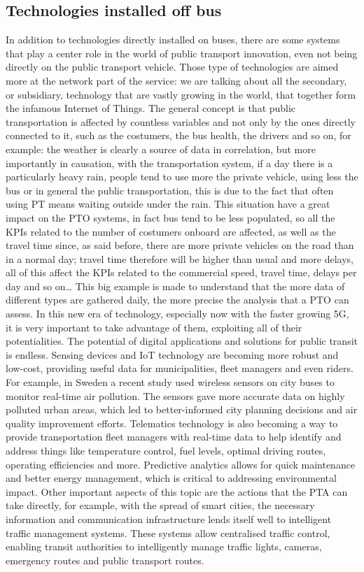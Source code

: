 \subsection{Technologies installed off bus}
\label{subsec:techoffbus}
In addition to technologies directly installed on buses, there are some systems that play a center role in the world of public transport innovation, even not being directly on the public transport vehicle. Those type of technologies are aimed more at the network part of the service: we are talking about all the secondary, or subsidiary, technology that are vastly growing in the world, that together form the infamous Internet of Things. 
The general concept is that public transportation is affected by countless variables and not only by the ones directly connected to it, such as the costumers, the bus health, the drivers and so on, for example: the weather is clearly a source of data in correlation, but more importantly in causation, with the transportation system, if a day there is a particularly heavy rain, people tend to use more the private vehicle, using less the bus or in general the public transportation, this is due to the fact that often using PT means waiting outside under the rain. This situation have a great impact on the PTO systems, in fact bus tend to be less populated, so all the KPIs related to the number of costumers onboard are affected, as well as the travel time since, as said before, there are more private vehicles on the road than in a normal day; travel time therefore will be higher than usual and more delays, all of this affect the KPIs related to the commercial speed, travel time, delays per day and so on…
This big example is made to understand that the more data of different types are gathered daily, the more precise the analysis that a PTO can assess. In this new era of technology, especially now with the faster growing 5G, it is very important to take advantage of them, exploiting all of their potentialities.
The potential of digital applications and solutions for public transit is endless. Sensing devices and IoT technology are becoming more robust and low-cost, providing useful data for municipalities, fleet managers and even riders. For example, in Sweden a recent study used wireless sensors on city buses to monitor real-time air pollution. The sensors gave more accurate data on highly polluted urban areas, which led to better-informed city planning decisions and air quality improvement efforts. 
Telematics technology is also becoming a way to provide transportation fleet managers with real-time data to help identify and address things like temperature control, fuel levels, optimal driving routes, operating efficiencies and more. Predictive analytics allows for quick maintenance and better energy management, which is critical to addressing environmental impact.
Other important aspects of this topic are the actions that the PTA can take directly, for example, with the spread of smart cities, the necessary information and communication infrastructure lends itself well to intelligent traffic management systems. These systems allow centralised traffic control, enabling transit authorities to intelligently manage traffic lights, cameras, emergency routes and public transport routes.

